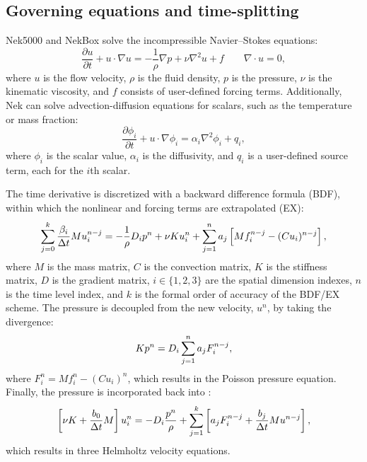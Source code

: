 \subsection{Governing equations and time-splitting}
Nek5000 and NekBox solve the incompressible Navier--Stokes equations:
\begin{equation}
\frac{\partial u}{\partial t} + u \cdot \nabla u = - \frac{1}{\rho} \nabla p + \nu \nabla^2 u + f \qquad
\nabla \cdot u = 0,
\end{equation}
where $u$ is the flow velocity, 
$\rho$ is the fluid density,
$p$ is the pressure,
$\nu$ is the kinematic viscosity,
and $f$ consists of user-defined forcing terms.
Additionally, Nek can solve advection-diffusion equations for scalars, such as the temperature or mass fraction:
\begin{equation}
\frac{\partial \phi_i}{\partial t} + u \cdot \nabla \phi_i =  \alpha_i \nabla^2 \phi_i + q_i,
\end{equation}
where $\phi_i$ is the scalar value, 
$\alpha_i$ is the diffusivity,
and $q_i$ is a user-defined source term, each for the $i$th scalar.

The time derivative is discretized with a backward difference formula (BDF), within which the nonlinear and forcing terms are extrapolated (EX):
\begin{equation}\elabel{semi}
\sum_{j=0}^k \frac{\beta_i}{\Delta t} M u_i^{n-j} = - \frac{1}{\rho} D_i p^n + \nu K u_i^n + \sum_{j=1}^n a_j\left[M f_i^{n-j} - (C u_i)^{n-j} \right],
\end{equation}
where $M$ is the mass matrix,
$C$ is the convection matrix,
$K$ is the stiffness matrix,
$D$ is the gradient matrix,
$i \in \{1,2,3\}$ are the spatial dimension indexes, 
$n$ is the time level index, and
$k$ is the formal order of accuracy of the BDF/EX scheme.
The pressure is decoupled from the new velocity, $u^n$, by taking the divergence:
\begin{equation} \elabel{pres}
K p^n = D_i \sum_{j=1}^n a_j F_i^{n-j},
\end{equation}
where $F_i^n = M f_i^n - (C u_i)^n$,
which results in the Poisson pressure equation.
Finally, the pressure is incorporated back into :
\begin{equation} \elabel{vel}
\left[\nu K + \frac{b_0}{\Delta t} M \right] u_i^n = -D_i \frac{p^n}{\rho} + \sum_{j=1}^k \left[a_j F_i^{n-j} + \frac{b_j}{\Delta t} M u^{n-j} \right], 
\end{equation}
which results in three Helmholtz velocity equations.

